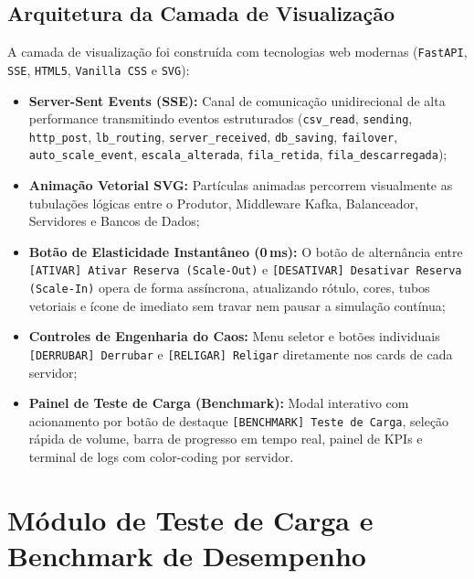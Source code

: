 \documentclass[12pt,a4paper]{article}
\begin{document}
\subsection{Arquitetura da Camada de Visualização}
A camada de visualização foi construída com tecnologias web modernas (\texttt{FastAPI}, \texttt{SSE}, \texttt{HTML5}, \texttt{Vanilla CSS} e \texttt{SVG}):
\begin{itemize}
	\item \textbf{Server-Sent Events (SSE):} Canal de comunicação unidirecional de alta performance transmitindo eventos estruturados (\texttt{csv\_read}, \texttt{sending}, \texttt{http\_post}, \texttt{lb\_routing}, \texttt{server\_received}, \texttt{db\_saving}, \texttt{failover}, \texttt{auto\_scale\_event}, \texttt{escala\_alterada}, \texttt{fila\_retida}, \texttt{fila\_descarregada});
	\item \textbf{Animação Vetorial SVG:} Partículas animadas percorrem visualmente as tubulações lógicas entre o Produtor, Middleware Kafka, Balanceador, Servidores e Bancos de Dados;
	\item \textbf{Botão de Elasticidade Instantâneo (0\,ms):} O botão de alternância entre \texttt{[ATIVAR] Ativar Reserva (Scale-Out)} e \texttt{[DESATIVAR] Desativar Reserva (Scale-In)} opera de forma assíncrona, atualizando rótulo, cores, tubos vetoriais e ícone de imediato sem travar nem pausar a simulação contínua;
	\item \textbf{Controles de Engenharia do Caos:} Menu seletor e botões individuais \texttt{[DERRUBAR] Derrubar} e \texttt{[RELIGAR] Religar} diretamente nos cards de cada servidor;
	\item \textbf{Painel de Teste de Carga (Benchmark):} Modal interativo com acionamento por botão de destaque \texttt{[BENCHMARK] Teste de Carga}, seleção rápida de volume, barra de progresso em tempo real, painel de KPIs e terminal de logs com color-coding por servidor.
\end{itemize}

\section{Módulo de Teste de Carga e Benchmark de Desempenho}
\end{document}
